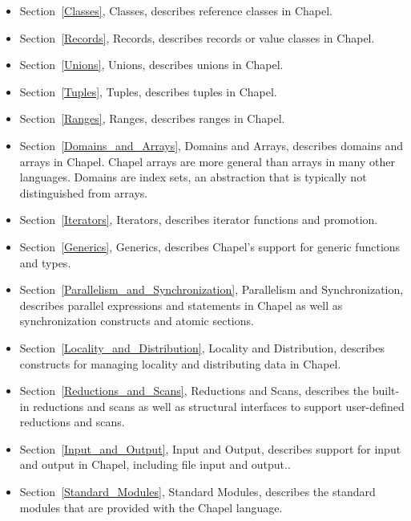 \begin{itemize}
\item
Section~\ref{Classes}, Classes, describes reference classes in Chapel.

\item
Section~\ref{Records}, Records, describes records or value classes in
Chapel.

\item
Section~\ref{Unions}, Unions, describes unions in Chapel.

\item
Section~\ref{Tuples}, Tuples, describes tuples in Chapel.

\item
Section~\ref{Ranges}, Ranges, describes ranges in Chapel.

\item
Section~\ref{Domains_and_Arrays}, Domains and Arrays, describes
domains and arrays in Chapel.  Chapel arrays are more general than
arrays in many other languages.  Domains are index sets, an
abstraction that is typically not distinguished from arrays.

\item
Section~\ref{Iterators}, Iterators, describes iterator functions and
promotion.

\item
Section~\ref{Generics}, Generics, describes Chapel's support for
generic functions and types.

\item
Section~\ref{Parallelism_and_Synchronization}, Parallelism and
Synchronization, describes parallel expressions and statements in
Chapel as well as synchronization constructs and atomic sections.

\item
Section~\ref{Locality_and_Distribution}, Locality and Distribution,
describes constructs for managing locality and distributing data in
Chapel.

\item
Section~\ref{Reductions_and_Scans}, Reductions and Scans, describes
the built-in reductions and scans as well as structural interfaces to
support user-defined reductions and scans.

\item
Section~\ref{Input_and_Output}, Input and Output, describes support
for input and output in Chapel, including file input and output..

\item
Section~\ref{Standard_Modules}, Standard Modules, describes the
standard modules that are provided with the Chapel language.

\end{itemize}
